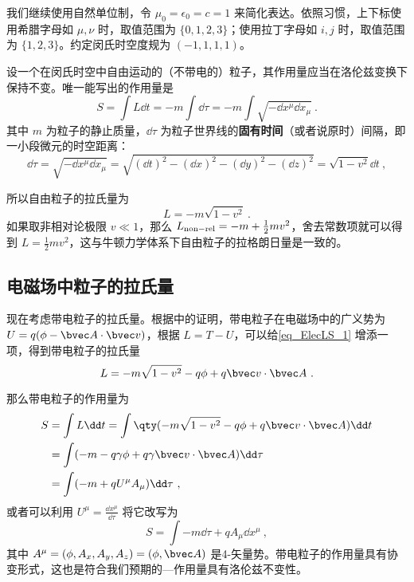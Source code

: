 
我们继续使用自然单位制，令 $\mu_0=\epsilon_0=c=1$ 来简化表达。依照习惯，上下标使用希腊字母如 $\mu, \nu$ 时，取值范围为 $\{0, 1, 2, 3\}$；使用拉丁字母如 $i, j$ 时，取值范围为 $\{1, 2, 3\}$。约定闵氏时空度规为 $(-1,1,1,1)$。

设一个在闵氏时空中自由运动的（不带电的）粒子，其作用量应当在洛伦兹变换下保持不变。唯一能写出的作用量是
\begin{equation}
S=\int L\dd t=-m\int \dd \tau=-m\int \sqrt{-\dd x^\mu \dd x_\mu}~.
\end{equation}
其中 $m$ 为粒子的静止质量，$\dd \tau$ 为粒子世界线的\textbf{固有时间}（或者说原时）间隔，即一小段微元的时空距离：
\begin{equation}
\dd \tau=\sqrt{-\dd x^\mu\dd x_\mu}=\sqrt{(\dd t)^2-(\dd x)^2-(\dd y)^2-(\dd z)^2}=\sqrt{1-v^2}\dd t~,
\end{equation}

所以自由粒子的拉氏量为
\begin{equation}\label{eq_ElecLS_1}
L=-m\sqrt{1-v^2}~.
\end{equation}
如果取非相对论极限 $v\ll 1$，那么 $L_{\rm{non-rel}}=-m+\frac{1}{2}mv^2$，舍去常数项就可以得到 $L=\frac{1}{2}mv^2$，这与牛顿力学体系下自由粒子的拉格朗日量是一致的。
\subsection{电磁场中粒子的拉氏量}
现在考虑带电粒子的拉氏量。根据中的证明，带电粒子在电磁场中的广义势为 $U=q(\phi-\bvec A\cdot \bvec v)$，根据 $L=T-U$，可以给\autoref{eq_ElecLS_1} 增添一项，得到带电粒子的拉氏量
\begin{equation}\label{eq_ElecLS_2}
L=-m\sqrt{1-v^2}-q\phi+q\bvec v\cdot \bvec A~.
\end{equation}

那么带电粒子的作用量为
\begin{equation}\label{eq_ElecLS_3}
\begin{aligned}
S&=\int L\dd t=\int \qty(-m\sqrt{1-v^2}-q\phi +q\bvec v\cdot \bvec A)\dd t\\
&=\int (-m-q\gamma\phi+q\gamma\bvec v\cdot \bvec A)\dd \tau\\
&=\int (-m+qU^\mu A_\mu)\dd \tau~,
\end{aligned}
\end{equation}
或者可以利用 $U^\mu= \frac{\dd x^\mu}{\dd \tau}$ 将它改写为
\begin{equation}\label{eq_ElecLS_4}
S=\int -m\dd \tau+qA_\mu \dd x^\mu~,
\end{equation}
其中 $A^\mu=(\phi,A_x,A_y,A_z)=(\phi,\bvec A)$ 是4-矢量势。带电粒子的作用量具有协变形式，这也是符合我们预期的—作用量具有洛伦兹不变性。


